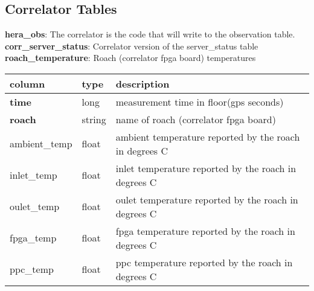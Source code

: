 \documentclass{article}
\begin{document}
\subsection{Correlator Tables}
\textbf{\large{hera\_obs}}: The correlator is the code that will write to the observation table.\\

\textbf{\large{corr\_server\_status}}: Correlator version of the server\_status table\\

\textbf{\large{roach\_temperature}}: Roach (correlator fpga board) temperatures
\begin{center}
 \begin{tabular}{| p{4cm} | p{2cm} | p{10cm} |}
\hline
 column & type & description \\ [0.5ex]  \hline\hline
\textbf{time} & long & measurement time in floor(gps seconds)\\ \hline
\textbf{roach} & string & name of roach (correlator fpga board) \\ \hline
ambient\_temp & float & ambient temperature reported by the roach in degrees C \\\hline
inlet\_temp & float & inlet temperature reported by the roach in degrees C \\\hline
oulet\_temp & float & oulet temperature reported by the roach in degrees C \\\hline
fpga\_temp & float & fpga temperature reported by the roach in degrees C \\\hline
ppc\_temp & float & ppc temperature reported by the roach in degrees C \\\hline
\end{tabular}
\end{center}
\end{document}
